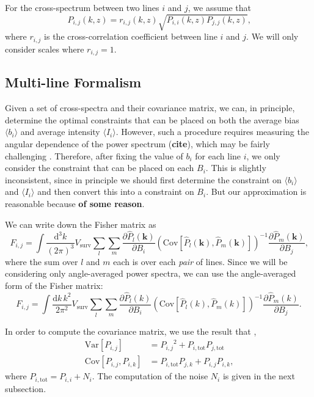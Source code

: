 \documentclass{aastex62}
\newcommand{\beq}{\begin{equation}}
\newcommand{\eeq}{\end{equation}}
\newcommand{\ps}[1]{\ensuremath{P_{#1,#1}}}
\newcommand{\xps}[2]{\ensuremath{P_{#1,#2}}}
\newcommand{\pstot}[1]{\ensuremath{P_{#1,\text{tot}}}}
\newcommand{\Var}[1]{\mathrm{Var}[#1]}
\newcommand{\Cov}[2]{\mathrm{Cov}[#1,#2]}
\newcommand{\avg}[1]{\ensuremath{\langle #1 \rangle}}
\newcommand{\bi}{\ensuremath{\avg{b_i}}}
\newcommand{\Ii}{\ensuremath{\avg{I_i}}}
\begin{document}
For the cross-spectrum between two lines $i$ and $j$, we assume that
\beq\label{eq:cross_spec}
P_{i,j}(k, z) = r_{i,j}(k, z) \sqrt{P_{i,i}(k, z) P_{j,j}(k, z)}\text{,}
\eeq
where $r_{i,j}$ is the cross-correlation coefficient between line $i$ and $j$.
We will only consider scales where $r_{i,j} = 1$.

\subsection{Multi-line Formalism}\label{ssec:multi_line}
Given a set of cross-spectra and their covariance matrix, we can, in
principle, determine the optimal constraints that can be placed on both the
average bias $\avg{b_i}$ and average intensity $\avg{I_i}$. However, such a
procedure requires measuring the angular dependence of the power spectrum
({\bf cite}), which may be fairly challenging \citep{2019arXiv190500209C}.
Therefore, after fixing the value of $b_i$ for each line $i$, we only consider
the constraint that can be placed on each $B_i$. This is slightly
inconsistent, since in principle we should first determine the constraint on
$\bi$ and $\Ii$ and then convert this into a constraint on $B_i$. But our
approximation is reasonable because {\bf of some reason}.

We can write down the Fisher matrix as
\beq\label{eq:fisher}
F_{i,j} = 
\int \frac{\text{d}^3k}{(2\pi)^3} V_{\text{surv}}
\sum_{l} \sum_{m}
\frac{\partial \hat{P}_{l}(\bm{k})}{\partial B_i}
\left(\Cov{\hat{P}_{l}(\bm{k})}{\hat{P}_{m}(\bm{k})}\right)^{-1}
\frac{\partial \hat{P}_{m}(\bm{k})}{\partial B_j}\text{,}
\eeq
where the sum over $l$ and $m$ each is over each \emph{pair} of lines. Since
we will be considering only angle-averaged power spectra, we can use the
angle-averaged form of the Fisher matrix:
\beq\label{eq:fisher}
F_{i,j} = 
\int \frac{\text{d}k\,k^2}{2\pi^2} V_{\text{surv}}
\sum_{l} \sum_{m}
\frac{\partial \hat{P}_{l}(k)}{\partial B_i}
\left(\Cov{\hat{P}_{l}(k)}{\hat{P}_{m}(k)}\right)^{-1}
\frac{\partial \hat{P}_{m}(k)}{\partial B_j}\text{.}
\eeq

In
order to compute the covariance matrix, we use the result that \citep[e.g.][]{2010JCAP...11..016V},
\beq\label{eq:var_cov}
\begin{split}
\Var{\xps{i}{j}} &= \xps{i}{j}^2 + \pstot{i}\pstot{j} \\
\Cov{\xps{i}{j}}{\xps{i}{k}} &= \pstot{i}\xps{j}{k} +
\xps{i}{j}\xps{i}{k}\text{,}
\end{split}
\eeq
where $\pstot{i} = \ps{i} + N_i$. The computation of the noise $N_i$ is given in the next subsection.
\end{document}
